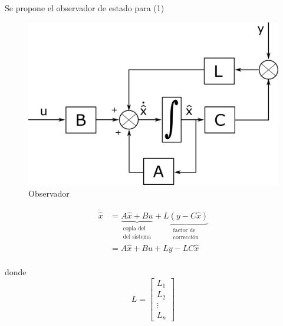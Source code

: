 Se propone el observador de estado para (1)
\begin{figure}[ht]
    \centering
        \includegraphics[scale=0.15]{Control de Sistemas Mecatronicos Figuras/10 Observador.png}
        \caption{Observador}
\end{figure}

\[
    \begin{split}
        \dot{\hat{x}} & = 
        \underbrace{A\hat{x} + Bu}_{
            \begin{matrix}
                \text{copia del} \\
                \text{del sistema}
            \end{matrix}}
            +
            \underbrace{L(y-C\hat{x})}_{
            \begin{matrix}
                \text{factor de} \\
                \text{corrección}
            \end{matrix}
            } \\
            & = A\hat{x} + Bu + Ly - LC\hat{x} \\
    \end{split}
\]

donde 
\[
    L = 
    \begin{bmatrix}
        L_{1} \\ L_{2} \\ \vdots \\ L_{n}
    \end{bmatrix}
\]

